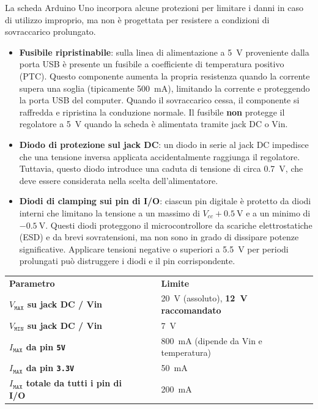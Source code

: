 La scheda Arduino Uno incorpora alcune protezioni per limitare i danni in caso di utilizzo improprio, ma non è progettata per resistere a condizioni di sovraccarico prolungato.

\begin{itemize}
    \item \textbf{Fusibile ripristinabile}: sulla linea di alimentazione a \SI{5}{\volt} proveniente dalla porta USB è presente un fusibile a coefficiente di temperatura positivo (PTC). Questo componente aumenta la propria resistenza quando la corrente supera una soglia (tipicamente \SI{500}{\milli\ampere}), limitando la corrente e proteggendo la porta USB del computer. Quando il sovraccarico cessa, il componente si raffredda e ripristina la conduzione normale. Il fusibile \textbf{non} protegge il regolatore a \SI{5}{\volt} quando la scheda è alimentata tramite jack DC o Vin.

    \item \textbf{Diodo di protezione sul jack DC}: un diodo in serie al jack DC impedisce che una tensione inversa applicata accidentalmente raggiunga il regolatore. Tuttavia, questo diodo introduce una caduta di tensione di circa \SI{0.7}{\volt}, che deve essere considerata nella scelta dell'alimentatore.

    \item \textbf{Diodi di clamping sui pin di I/O}: ciascun pin digitale è protetto da diodi interni che limitano la tensione a un massimo di $V_{cc} + \SI{0.5}{\volt}$ e a un minimo di $\SI{-0.5}{\volt}$. Questi diodi proteggono il microcontrollore da scariche elettrostatiche (ESD) e da brevi sovratensioni, ma non sono in grado di dissipare potenze significative. Applicare tensioni negative o superiori a \SI{5.5}{\volt} per periodi prolungati può distruggere i diodi e il pin corrispondente.
\end{itemize}

\begin{tcolorbox}[colback=red!4, colframe=red!60, title=\textbf{Riepilogo – Limiti operativi assoluti}]
    \begin{center}
    \begin{tabular}{>{\bfseries}l l l}
        Parametro & $\quad$ & \textbf{Limite} \vspace{0.1cm}\\
        $V_\texttt{MAX}$ su jack DC / Vin & & \SI{20}{\volt} (assoluto), \textbf{\SI{12}{\volt} raccomandato} \\
        $V_\texttt{MIN}$ su jack DC / Vin  & & \SI{7}{\volt} \\
        $I_\texttt{MAX}$ da pin \texttt{5V} && \SI{800}{\milli\ampere} (dipende da Vin e temperatura) \\
        $I_\texttt{MAX}$ da pin \texttt{3.3V} && \SI{50}{\milli\ampere} \\
        $I_\texttt{MAX}$ totale da tutti i pin di I/O && \SI{200}{\milli\ampere} \\
    \end{tabular}
    \end{center}
\end{tcolorbox}

